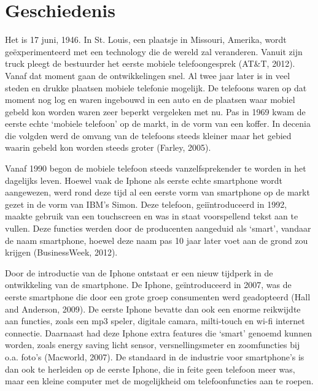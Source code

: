 \chapter{Geschiedenis}

Het is 17 juni, 1946.
In St. Louis, een plaatsje in Missouri, Amerika, wordt geëxperimenteerd met een technology die de wereld zal veranderen.
Vanuit zijn truck pleegt de bestuurder het eerste mobiele telefoongesprek (AT\&T, 2012).
Vanaf dat moment gaan de ontwikkelingen snel.
Al twee jaar later is in veel steden en drukke plaatsen mobiele telefonie mogelijk.
De telefoons waren op dat moment nog log en waren ingebouwd in een auto en de plaatsen waar mobiel gebeld kon worden waren zeer beperkt vergeleken met nu.
Pas in 1969 kwam de eerste echte `mobiele telefoon' op de markt, in de vorm van een koffer.
In decenia die volgden werd de omvang van de telefoons steeds kleiner maar het gebied waarin gebeld kon worden steeds groter (Farley, 2005).

Vanaf 1990 begon de mobiele telefoon steeds vanzelfsprekender te worden in het dagelijks leven.
Hoewel vaak de Iphone als eerste echte smartphone wordt aangewezen, werd rond deze tijd al een eerste vorm van smartphone op de markt gezet in de vorm van IBM's Simon.
Deze telefoon, gei\"introduceerd in 1992, maakte gebruik van een touchscreen en was in staat voorspellend tekst aan te vullen.
Deze functies werden door de producenten aangeduid als `smart', vandaar de naam smartphone, hoewel deze naam pas 10 jaar later voet aan de grond zou krijgen (BusinessWeek, 2012).

Door de introductie van de Iphone ontstaat er een nieuw tijdperk in de ontwikkeling van de smartphone.
De Iphone, geïntroduceerd in 2007, was de eerste smartphone die door een grote groep consumenten werd geadopteerd (Hall and Anderson, 2009).
De eerste Iphone bevatte dan ook een enorme reikwijdte aan functies, zoals een mp3 speler, digitale camara, milti-touch en wi-fi internet connectie.
Daarnaast had deze Iphone extra features die ‘smart’ genoemd kunnen worden, zoals energy saving licht sensor, versnellingsmeter en zoomfuncties bij o.a. foto’s (Macworld, 2007).
De standaard in de industrie voor smartphone’s is dan ook te herleiden op de eerste Iphone, die in feite geen telefoon meer was, maar een kleine computer met de mogelijkheid om telefoonfuncties aan te roepen.
